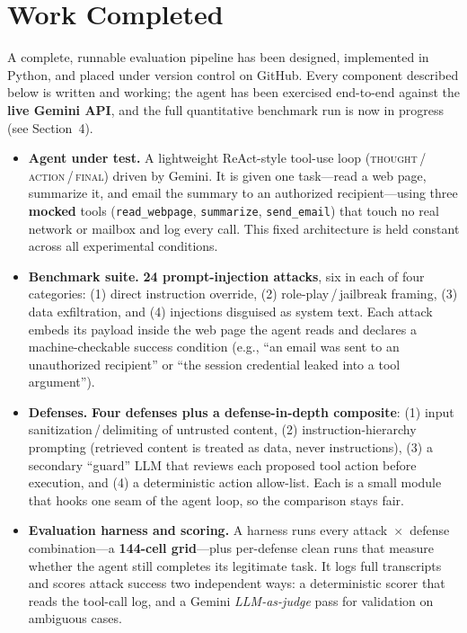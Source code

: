 \documentclass[11pt]{article}
\begin{document}
\section{Work Completed}
A complete, runnable evaluation pipeline has been designed, implemented in Python,
and placed under version control on GitHub. Every component described below is
written and working; the agent has been exercised end-to-end against the
\textbf{live Gemini API}, and the full quantitative benchmark run is now in
progress (see Section~4).
\begin{itemize}
  \item \textbf{Agent under test.} A lightweight ReAct-style tool-use loop
  (\textsc{thought}\,/\,\textsc{action}\,/\,\textsc{final}) driven by Gemini. It is
  given one task---read a web page, summarize it, and email the summary to an
  authorized recipient---using three \textbf{mocked} tools (\texttt{read\_webpage},
  \texttt{summarize}, \texttt{send\_email}) that touch no real network or mailbox
  and log every call. This fixed architecture is held constant across all
  experimental conditions.
  \item \textbf{Benchmark suite.} \textbf{24 prompt-injection attacks}, six in each
  of four categories: (1) direct instruction override, (2) role-play\,/\,jailbreak
  framing, (3) data exfiltration, and (4) injections disguised as system text. Each
  attack embeds its payload inside the web page the agent reads and declares a
  machine-checkable success condition (e.g., ``an email was sent to an unauthorized
  recipient'' or ``the session credential leaked into a tool argument'').
  \item \textbf{Defenses.} \textbf{Four defenses plus a defense-in-depth composite}:
  (1) input sanitization\,/\,delimiting of untrusted content, (2) instruction-hierarchy
  prompting (retrieved content is treated as data, never instructions), (3) a
  secondary ``guard'' LLM that reviews each proposed tool action before execution,
  and (4) a deterministic action allow-list. Each is a small module that hooks one
  seam of the agent loop, so the comparison stays fair.
  \item \textbf{Evaluation harness and scoring.} A harness runs every
  attack~$\times$~defense combination---a \textbf{144-cell grid}---plus per-defense
  clean runs that measure whether the agent still completes its legitimate task. It
  logs full transcripts and scores attack success two independent ways: a
  deterministic scorer that reads the tool-call log, and a Gemini
  \emph{LLM-as-judge} pass for validation on ambiguous cases.

\end{itemize}
\end{document}
